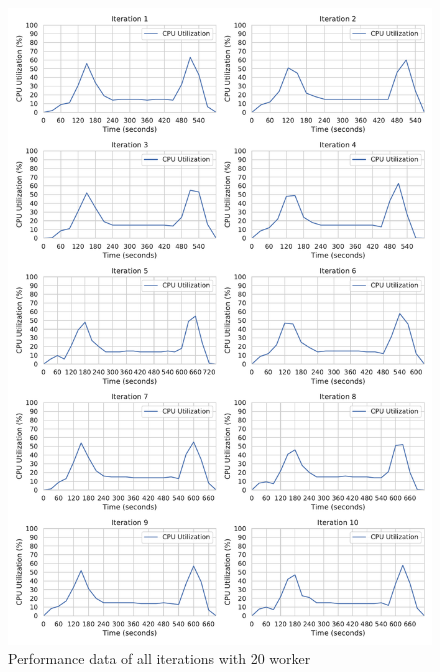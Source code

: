 \begin{figure}[h]
\centering
\includegraphics[scale=0.4]{images/07_evaluation/classification/20_worker_cpu_performance}
\caption{Performance data of all iterations with 20 worker}
\label{fig:appendix_eval_classification_static20}
\end{figure}

